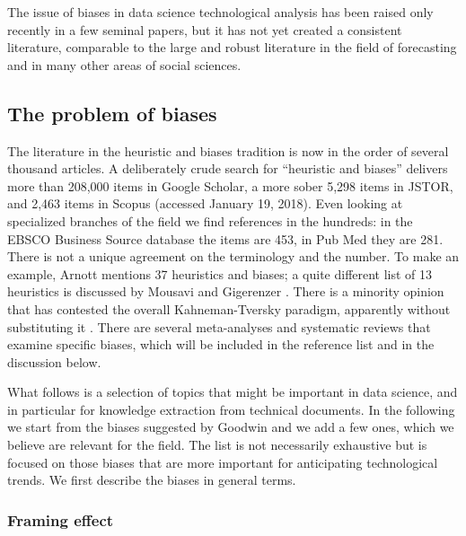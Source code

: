 \documentclass[b5paper,]{book}
\theoremstyle{definition}
\theoremstyle{definition}
\theoremstyle{definition}
\theoremstyle{remark}
\begin{document}
The issue of biases in data science technological analysis has been
raised only recently in a few seminal papers, but it has not yet created
a consistent literature, comparable to the large and robust literature
in the field of forecasting and in many other areas of social sciences.

\subsection{The problem of biases}\label{sotadocumentsunderstandbyas}

The literature in the heuristic and biases tradition is now in the order
of several thousand articles. A deliberately crude search for
``heuristic and biases'' delivers more than 208,000 items in Google
Scholar, a more sober 5,298 items in JSTOR, and 2,463 items in Scopus
(accessed January 19, 2018). Even looking at specialized branches of the
field we find references in the hundreds: in the EBSCO Business Source
database the items are 453, in Pub Med they are 281. There is not a
unique agreement on the terminology and the number. To make an example,
Arnott \citep{arnott1998decision} mentions 37 heuristics and biases; a
quite different list of 13 heuristics is discussed by Mousavi and
Gigerenzer \citep{mousavi2014risk}. There is a minority opinion that has
contested the overall Kahneman-Tversky \citep{kahneman2011thinking}
paradigm, apparently without substituting it \citep{gigerenzer1991make}.
There are several meta-analyses and systematic reviews that examine
specific biases, which will be included in the reference list and in the
discussion below.

What follows is a selection of topics that might be important in data
science, and in particular for knowledge extraction from technical
documents. In the following we start from the biases suggested by
Goodwin \citep{goodwin2015history} and we add a few ones, which we
believe are relevant for the field. The list is not necessarily
exhaustive but is focused on those biases that are more important for
anticipating technological trends. We first describe the biases in
general terms.

\subsubsection*{Framing effect}\label{framing-effect}
\end{document}
